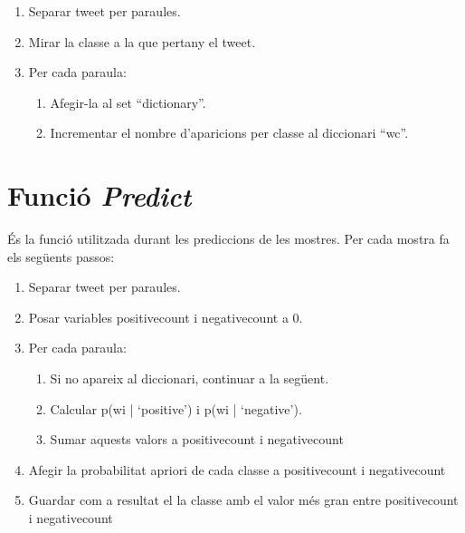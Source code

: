 \begin{enumerate}
    \item Separar tweet per paraules.
    \item Mirar la classe a la que pertany el tweet.
    \item Per cada paraula:
        \begin{enumerate}[label=\alph*.]
        \item Afegir-la al set “dictionary”.
        \item Incrementar el nombre d’aparicions per classe al diccionari “wc”.
        \end{enumerate}
\end{enumerate}

\section{Funció \textit{Predict}}
És la funció utilitzada durant les prediccions de les mostres. Per cada mostra fa els següents passos:

\begin{enumerate}
\item Separar tweet per paraules.
\item Posar variables positive\textunderscore count i negative\textunderscore count a 0.
\item Per cada paraula:

        \begin{enumerate}[label=\alph*.]
        \item Si no apareix al diccionari, continuar a la següent.
        \item Calcular p(wi | ‘positive’) i p(wi | ‘negative’).
        \item Sumar aquests valors a positive\textunderscore count i negative\textunderscore count

        \end{enumerate}
\item Afegir la probabilitat apriori de cada classe a positive\textunderscore count i negative\textunderscore count 
\item Guardar com a resultat el la classe amb el valor més gran entre positive\textunderscore count i negative\textunderscore count

\end{enumerate}